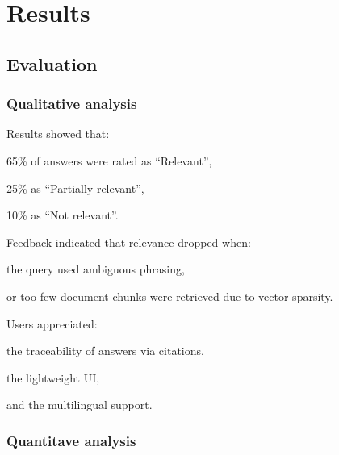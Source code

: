 \chapter{Results}
\label{chap:results}
\begin{spacing}{1.5}

\section{Evaluation}
\subsection{Qualitative analysis}
Results showed that:

65\% of answers were rated as “Relevant”,

25\% as “Partially relevant”,

10\% as “Not relevant”.

Feedback indicated that relevance dropped when:

the query used ambiguous phrasing,

or too few document chunks were retrieved due to vector sparsity.

Users appreciated:

the traceability of answers via citations,

the lightweight UI,

and the multilingual support.

\subsection{Quantitave analysis}

\end{spacing}